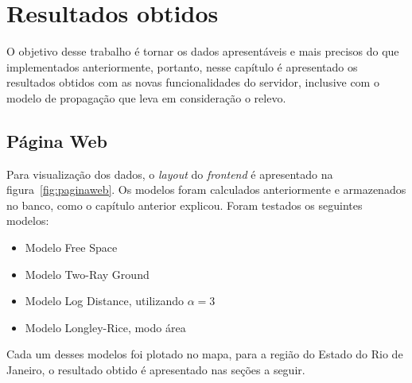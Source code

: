 \chapter{Resultados obtidos}

O objetivo desse trabalho é tornar os dados apresentáveis e mais precisos do que implementados anteriormente, portanto, nesse capítulo é apresentado os resultados obtidos com as novas funcionalidades do servidor, inclusive com o modelo de propagação que leva em consideração o relevo.

\section{Página Web}

Para visualização dos dados, o \textit{layout} do \textit{frontend} é apresentado na figura~\ref{fig:paginaweb}. Os modelos foram calculados anteriormente e armazenados no banco, como o capítulo anterior explicou.
Foram testados os seguintes modelos:

\begin{itemize}
\item Modelo Free Space
\item Modelo Two-Ray Ground
\item Modelo Log Distance, utilizando \begin{math}\alpha=3 \end{math}
\item Modelo Longley-Rice, modo área
\end{itemize}

Cada um desses modelos foi plotado no mapa, para a região do Estado do Rio de Janeiro, o resultado obtido é apresentado nas seções a seguir.

